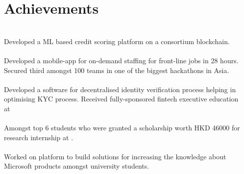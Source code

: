 \documentclass[]{deedy-resume-openfont}
\begin{document}
\begin{minipage}[t]{0.35\textwidth}
\section{Achievements}
\\
{Developed a ML based credit scoring platform on a consortium blockchain.}\\
\vspace{1.5 mm}
\\
{Developed a mobile-app for on-demand staffing for front-line jobs
in 28 hours. Secured third amongst 100
teams in one of the biggest hackathons in
Asia.}\\
\vspace{1.5 mm}
\\
{Developed a software for decentralised
identity verification process helping in
optimising KYC process. Received 
fully-sponsored fintech executive education \\at \textbf{}}\\
\vspace{1.5 mm}
\\
{Amongst top 6 students who were granted
a scholarship worth HKD 46000 for research
internship at .}\\
\vspace{1.5 mm}
\\
{Worked on  platform to build
solutions for increasing the knowledge
about Microsoft products amongst
university students.}
\sectionsep









 
 

\end{minipage}
\end{document}

